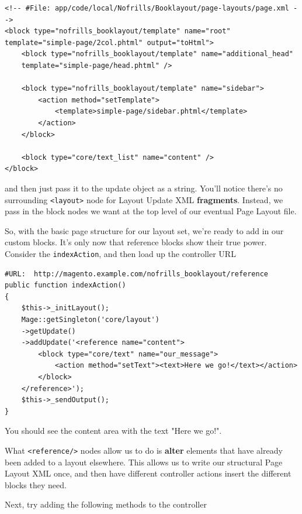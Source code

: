 \documentclass[oneside]{book}
\begin{document}
\begin{lstlisting}
<!-- #File: app/code/local/Nofrills/Booklayout/page-layouts/page.xml -->
<block type="nofrills_booklayout/template" name="root" 
template="simple-page/2col.phtml" output="toHtml">
    <block type="nofrills_booklayout/template" name="additional_head"
    template="simple-page/head.phtml" />

    <block type="nofrills_booklayout/template" name="sidebar">
        <action method="setTemplate">
            <template>simple-page/sidebar.phtml</template>
        </action>
    </block>

    <block type="core/text_list" name="content" />
</block>

\end{lstlisting}


and then just pass it to the update object as a string.  You'll notice there's no surrounding \footnotesize\texttt{\textless layout\textgreater } \normalsize  node for Layout Update XML \textbf{fragments}.  Instead, we pass in the block nodes we want at the top level of our eventual Page Layout file.

So, with the basic page structure for our layout set, we're ready to add in our custom blocks.  It's only now that reference blocks show their true power.  Consider the \footnotesize\texttt{indexAction}\normalsize, and then load up the controller URL

\begin{lstlisting}
#URL:  http://magento.example.com/nofrills_booklayout/reference
public function indexAction()
{
    $this->_initLayout();
    Mage::getSingleton('core/layout')
    ->getUpdate()
    ->addUpdate('<reference name="content">
        <block type="core/text" name="our_message">
            <action method="setText"><text>Here we go!</text></action>
        </block>
    </reference>');
    $this->_sendOutput();
}

\end{lstlisting}


You should see the content area with the text "Here we go!".

What \footnotesize\texttt{\textless reference/\textgreater } \normalsize  nodes allow us to do is \textbf{alter} elements that have already been added to a layout elsewhere. This allows us to write our structural Page Layout XML once, and then have different controller actions insert the different blocks they need. 

Next, try adding the following methods to the controller
\end{document}
